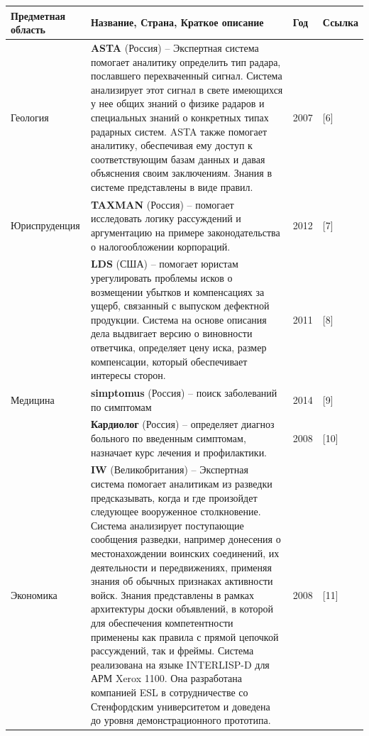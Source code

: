 \documentclass[14pt,a4paper,report]{report}
\begin{document}
\begin{table}[h!]
\centering
\bgroup
\def\arraystretch{1}
\begin{tabular}{ | P{2,5cm} | P{12cm} | P{0,7cm} | P{1,3cm} | }
\hline
Предметная область & Название, Страна, Краткое описание & Год & Ссылка 
\\ \hline

Геология 


& \textbf{ASTA} (Россия) -- Экспертная система помогает аналитику определить тип радара, пославшего перехваченный сигнал. Система анализирует этот сигнал в свете имеющихся у нее общих знаний о физике радаров и специальных знаний о конкретных типах радарных систем. ASTA также помогает аналитику, обеспечивая ему доступ к соответствующим базам данных и давая объяснения своим заключениям. Знания в системе представлены в виде правил. & 2007 & [6] \\ \hline




Юриспруденция 



& \textbf{TAXMAN} (Россия) -- помогает исследовать логику рассуждений и аргументацию на примере законодательства о налогообложении корпораций. & 2012 & [7] \\ \hline

& \textbf{LDS} (США) -- помогает юристам урегулировать проблемы исков о возмещении убытков и компенсациях за ущерб, связанный с выпуском дефектной продукции. Система на основе описания дела выдвигает версию о виновности ответчика, определяет цену иска, размер компенсации, который обеспечивает интересы сторон. & 2011 & [8] \\ \hline


Медицина 

& \textbf{simptomus} (Россия) -- поиск заболеваний по симптомам & 2014 & [9] \\ \hline

& \textbf{Кардиолог} (Россия) -- определяет диагноз больного по введенным симптомам, назначает курс лечения и профилактики. & 2008 & [10] \\ \hline


Экономика 

& \textbf{IW} (Великобритания) -- Экспертная система помогает аналитикам из разведки предсказывать, когда и где произойдет следующее вооруженное столкновение. Система анализирует поступающие сообщения разведки, например донесения о местонахождении воинских соединений, их деятельности и передвижениях, применяя знания об обычных признаках активности войск. Знания представлены в рамках архитектуры доски объявлений, в которой для обеспечения компетентности применены как правила с прямой цепочкой рассуждений, так и фреймы. Система реализована на языке INTERLISP-D для АРМ Xerox 1100. Она разработана компанией ESL в сотрудничестве со Стенфордским университетом и доведена до уровня демонстрационного прототипа. & 2008 & [11] \\ \hline


\end{tabular}
\end{table}
\end{document}

